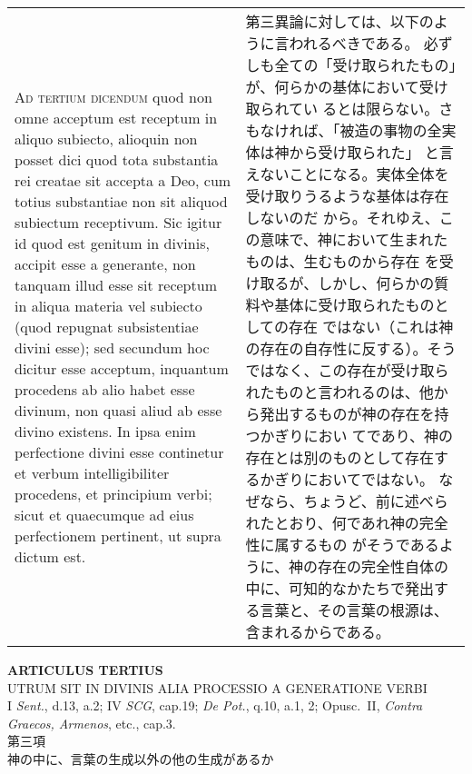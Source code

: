 \documentclass[10pt]{jsarticle} %
\begin{document}
\begin{longtable}{p{21em}p{21em}}
\\



{\scshape Ad tertium dicendum} quod non omne acceptum est receptum in aliquo
subiecto, alioquin non posset dici quod tota substantia rei creatae sit
accepta a Deo, cum totius substantiae non sit aliquod subiectum
receptivum. Sic igitur id quod est genitum in divinis, accipit esse a
generante, non tanquam illud esse sit receptum in aliqua materia vel
subiecto (quod repugnat subsistentiae divini esse); sed secundum hoc
dicitur esse acceptum, inquantum procedens ab alio habet esse divinum,
non quasi aliud ab esse divino existens. In ipsa enim perfectione divini
esse continetur et verbum intelligibiliter procedens, et principium
verbi; sicut et quaecumque ad eius perfectionem pertinent, ut supra
dictum est.


&

第三異論に対しては、以下のように言われるべきである。
必ずしも全ての「受け取られたもの」が、何らかの基体において受け取られてい
 るとは限らない。さもなければ、「被造の事物の全実体は神から受け取られた」
 と言えないことになる。実体全体を受け取りうるような基体は存在しないのだ
 から。それゆえ、この意味で、神において生まれたものは、生むものから存在
 を受け取るが、しかし、何らかの質料や基体に受け取られたものとしての存在
 ではない（これは神の存在の自存性に反する）。そうではなく、この存在が受け取ら
 れたものと言われるのは、他から発出するものが神の存在を持つかぎりにおい
 てであり、神の存在とは別のものとして存在するかぎりにおいてではない。
なぜなら、ちょうど、前に述べられたとおり、何であれ神の完全性に属するもの
 がそうであるように、神の存在の完全性自体の中に、可知的なかたちで発出す
 る言葉と、その言葉の根源は、含まれるからである。

\\


\end{longtable}
\newpage



\begin{center}
 {\Large {\bf ARTICULUS TERTIUS}}\\
 {\large UTRUM SIT IN DIVINIS ALIA PROCESSIO A GENERATIONE VERBI}\\
 {\footnotesize I {\itshape Sent.}, d.13, a.2; IV {\itshape SCG},
 cap.19; {\itshape De Pot.}, q.10, a.1, 2; Opusc.~II, {\itshape Contra
 Graecos, Armenos}, etc., cap.3.}\\
 {\Large 第三項\\神の中に、言葉の生成以外の他の生成があるか}
\end{center}
\end{document}
